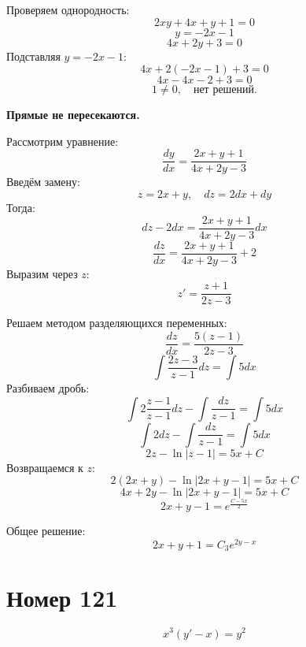 \begin{solution}
    Проверяем однородность:  
    $$ 2xy + 4x + y + 1 = 0 $$  
    $$ y = -2x - 1 $$  
    $$ 4x + 2y + 3 = 0 $$  
    Подставляя $y = -2x - 1$:  
    $$ 4x + 2(-2x - 1) + 3 = 0 $$  
    $$ 4x - 4x - 2 + 3 = 0 $$  
    $$ 1 \neq 0, \quad \text{нет решений.} $$  

    \textbf{Прямые не пересекаются.}  

    Рассмотрим уравнение:  
    $$ \frac{dy}{dx} = \frac{2x + y + 1}{4x + 2y - 3} $$  
    Введём замену:  
    $$ z = 2x + y, \quad dz = 2dx + dy $$  
    Тогда:  
    $$ dz - 2dx = \frac{2x + y + 1}{4x + 2y - 3} dx $$  
    $$ \frac{dz}{dx} = \frac{2x + y + 1}{4x + 2y - 3} + 2 $$  
    Выразим через $z$:  
    $$ z' = \frac{z + 1}{2z - 3} $$  

    Решаем методом разделяющихся переменных:  
    $$ \frac{dz}{dx} = \frac{5(z - 1)}{2z - 3} $$  
    $$ \int \frac{2z - 3}{z - 1} dz = \int 5dx $$  
    Разбиваем дробь:  
    $$ \int 2 \frac{z - 1}{z - 1} dz - \int \frac{dz}{z - 1} = \int 5 dx $$  
    $$ \int 2 dz - \int \frac{dz}{z - 1} = \int 5 dx $$  
    $$ 2z - \ln |z - 1| = 5x + C $$  
    Возвращаемся к $z$:  
    $$ 2(2x + y) - \ln |2x + y - 1| = 5x + C $$  
    $$ 4x + 2y - \ln |2x + y - 1| = 5x + C $$  
    $$ 2x + y - 1 = e^{\frac{C - 5x}{2}} $$  

    Общее решение:  
    $$ 2x + y + 1 = C_3 e^{2y - x} $$  
\end{solution}\pagebreak

\section*{Номер 121}

$$ x^3 \left( y' - x \right) = y^2 $$

